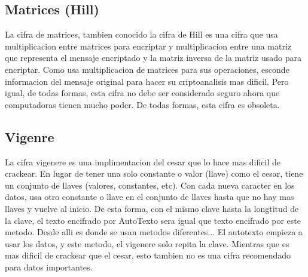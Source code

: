 \documentclass{article}
\begin{document}
		\subsection{Matrices (Hill)}
			La cifra de matrices, tambien conocido la cifra de Hill es una cifra que usa multiplicacion entre matrices para encriptar y multiplicacion entre una matriz que representa el mensaje encriptado y la matriz inversa de la matriz usado para encriptar. Como usa multiplicacion de matrices para sus operaciones, esconde informacion del mensaje original para hacer su criptoanalisis mas dificil. Pero igual, de todas formas, esta cifra no debe ser considerado seguro ahora que computadoras tienen mucho poder. De todas formas, esta cifra es obsoleta.
		\subsection{Vigenre}
			La cifra vigenere es una implimentacion del cesar que lo hace mas dificil de crackear. En lugar de tener una solo constante o valor (llave) como el cesar, tiene un conjunto de llaves (valores, constantes, etc). Con cada nueva caracter en los datos, usa otro constante o llave en el conjunto de llaves hasta que no hay mas llaves y vuelve al inicio. De esta forma, con el mismo clave hasta la longtitud de la clave, el texto encifrado por AutoTexto sera igual que texto encifrado por este metodo. Desde alli es donde se usan metodos diferentes... El autotexto empieza a usar los datos, y este metodo, el vigenere solo repita la clave. Mientras que es mas dificil de crackear que el cesar, esto tambien no es una cifra recomendado para datos importantes.
\end{document}
